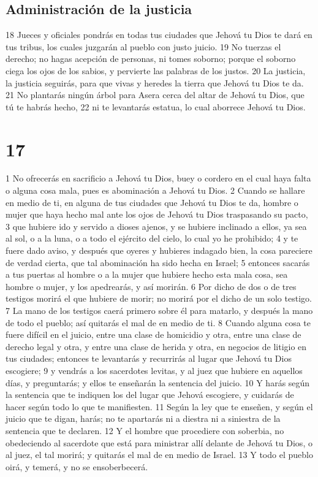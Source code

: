 \section{Administración de la justicia}

18 Jueces y oficiales pondrás en todas tus ciudades que Jehová tu Dios te dará en tus tribus, los cuales juzgarán al pueblo con justo juicio.
19 No tuerzas el derecho; no hagas acepción de personas, ni tomes soborno; porque el soborno ciega los ojos de los sabios, y pervierte las palabras de los justos.
20 La justicia, la justicia seguirás, para que vivas y heredes la tierra que Jehová tu Dios te da.
21 No plantarás ningún árbol para Asera cerca del altar de Jehová tu Dios, que tú te habrás hecho,
22 ni te levantarás estatua, lo cual aborrece Jehová tu Dios.

\chapter{17}


1 No ofrecerás en sacrificio a Jehová tu Dios, buey o cordero en el cual haya falta o alguna cosa mala, pues es abominación a Jehová tu Dios.
2 Cuando se hallare en medio de ti, en alguna de tus ciudades que Jehová tu Dios te da, hombre o mujer que haya hecho mal ante los ojos de Jehová tu Dios traspasando su pacto,
3 que hubiere ido y servido a dioses ajenos, y se hubiere inclinado a ellos, ya sea al sol, o a la luna, o a todo el ejército del cielo, lo cual yo he prohibido;
4 y te fuere dado aviso, y después que oyeres y hubieres indagado bien, la cosa pareciere de verdad cierta, que tal abominación ha sido hecha en Israel;
5 entonces sacarás a tus puertas al hombre o a la mujer que hubiere hecho esta mala cosa, sea hombre o mujer, y los apedrearás, y así morirán.
6 Por dicho de dos o de tres testigos morirá el que hubiere de morir; no morirá por el dicho de un solo testigo.
7 La mano de los testigos caerá primero sobre él para matarlo, y después la mano de todo el pueblo; así quitarás el mal de en medio de ti.
8 Cuando alguna cosa te fuere difícil en el juicio, entre una clase de homicidio y otra, entre una clase de derecho legal y otra, y entre una clase de herida y otra, en negocios de litigio en tus ciudades; entonces te levantarás y recurrirás al lugar que Jehová tu Dios escogiere;
9 y vendrás a los sacerdotes levitas, y al juez que hubiere en aquellos días, y preguntarás; y ellos te enseñarán la sentencia del juicio.
10 Y harás según la sentencia que te indiquen los del lugar que Jehová escogiere, y cuidarás de hacer según todo lo que te manifiesten.
11 Según la ley que te enseñen, y según el juicio que te digan, harás; no te apartarás ni a diestra ni a siniestra de la sentencia que te declaren.
12 Y el hombre que procediere con soberbia, no obedeciendo al sacerdote que está para ministrar allí delante de Jehová tu Dios, o al juez, el tal morirá; y quitarás el mal de en medio de Israel.
13 Y todo el pueblo oirá, y temerá, y no se ensoberbecerá.

